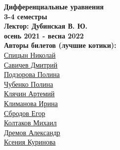 


    \thispagestyle{empty}
    \BgThispage
    \begin{center}
        \vspace*{4cm}
        
        \Huge
        \textbf{Дифференциальные уравнения} \\
        \textbf{3-4 семестры} \\
        \textbf{Лектор: Дубинская В. Ю.} \\
        \textbf{осень 2021 - весна 2022} \\
    
        
        \vspace{7cm}
        \Large
        \textbf{Авторы билетов (лучшие котики):} \\
        \href{https://vk.com/spitsynn}{Спицын Николай} \\
        \href{https://vk.com/dimasav123}{Савичев Дмитрий} \\
        \href{https://vk.com/id165779384}{Подзорова Полина} \\
        \href{https://vk.com/poli.dobro}{Чубенко Полина} \\
        \href{https://vk.com/id340504554}{Клячин Артемий} \\
        \href{https://vk.com/meraklim}{Климанова Ирина} \\
        \href{https://vk.com/ulegor}{Сбродов Егор} \\
        \href{https://vk.com/id153425653}{Колтаков Михаил} \\
        \href{https://vk.com/alex__roar}{Дремов Александр} \\
        \href{https://vk.com/ksinomorph}{Ксения Куринова}
    \end{center}

\newpage

\tableofcontents
\newpage





